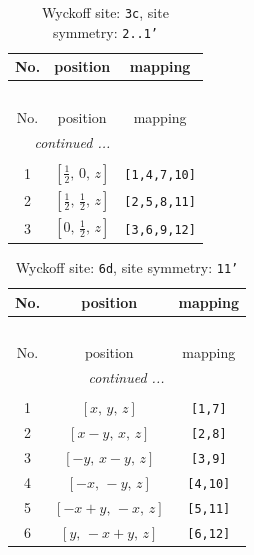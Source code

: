 \documentclass[fleqn,8pt]{jsarticle}
\begin{document}
\begin{longtable}{ccc}
\caption{Wyckoff site: {\tt 3c}, site symmetry: {\tt 2..1'}}
 \\
 \hline \hline
No. & position & mapping \\ \hline \endfirsthead

\multicolumn{2}{l}{\tablename\ \thetable{}} \\
 \hline \hline
No. & position & mapping \\ \hline \endhead

 \hline \hline
\multicolumn{2}{r}{\footnotesize\it continued ...} \\ \endfoot

 \hline \hline
\multicolumn{2}{r}{} \\ \endlastfoot

1 & $\left[ \frac{1}{2},\, 0,\, z \right]$ & {\tt [1,4,7,10]} \\ \hline
2 & $\left[ \frac{1}{2},\, \frac{1}{2},\, z \right]$ & {\tt [2,5,8,11]} \\ \hline
3 & $\left[ 0,\, \frac{1}{2},\, z \right]$ & {\tt [3,6,9,12]} \\
\end{longtable}
\renewcommand{\arraystretch}{1.2}
\begin{longtable}{ccc}
\caption{Wyckoff site: {\tt 6d}, site symmetry: {\tt 11'}}
 \\
 \hline \hline
No. & position & mapping \\ \hline \endfirsthead

\multicolumn{2}{l}{\tablename\ \thetable{}} \\
 \hline \hline
No. & position & mapping \\ \hline \endhead

 \hline \hline
\multicolumn{2}{r}{\footnotesize\it continued ...} \\ \endfoot

 \hline \hline
\multicolumn{2}{r}{} \\ \endlastfoot

1 & $\left[ x,\, y,\, z \right]$ & {\tt [1,7]} \\ \hline
2 & $\left[ x - y,\, x,\, z \right]$ & {\tt [2,8]} \\ \hline
3 & $\left[ - y,\, x - y,\, z \right]$ & {\tt [3,9]} \\ \hline
4 & $\left[ - x,\, - y,\, z \right]$ & {\tt [4,10]} \\ \hline
5 & $\left[ - x + y,\, - x,\, z \right]$ & {\tt [5,11]} \\ \hline
6 & $\left[ y,\, - x + y,\, z \right]$ & {\tt [6,12]} \\
\end{longtable}
\end{document}
